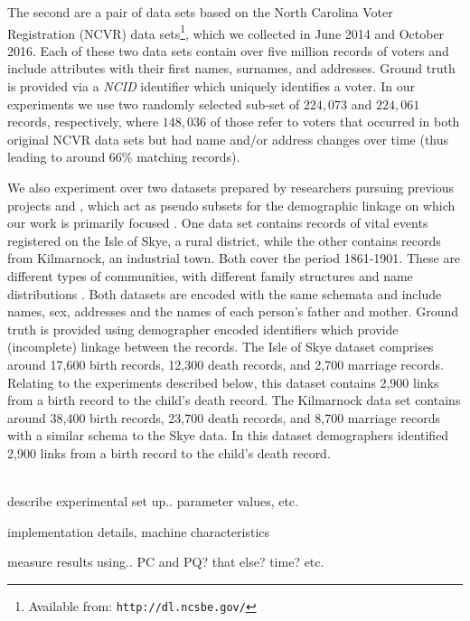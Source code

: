 \documentclass{llncs}
\begin{document}
The second are a pair of data sets based on the North Carolina Voter
Registration (NCVR) data sets\footnote{Available from: \texttt{http://dl.ncsbe.gov/}}, which we collected in June 2014 and
October 2016. Each of these two data sets contain over five million
records of voters and include attributes with their first names,
surnames, and addresses. Ground truth is provided via a \emph{NCID}
identifier which uniquely identifies a voter. In our experiments we
use two randomly selected sub-set of $224,073$ and $224,061$ records,
respectively, where $148,036$ of those refer to voters that occurred
in both original NCVR data sets but had name and/or address changes
over time (thus leading to around $66\%$ matching records).


We also experiment over two datasets prepared by researchers pursuing previous projects \cite{reid2002} and \cite{reid2006}, which act as pseudo subsets for the demographic linkage on which our work is primarily focused . One data set contains records of vital events registered on the Isle of Skye, a rural district, while the other contains records from Kilmarnock, an industrial town. Both cover the period 1861-1901. These are different types of communities, with different family structures and name distributions \cite{reid2002}. Both datasets are encoded with the same schemata and include names, sex, addresses and the names of each person's father and mother. Ground truth is provided using demographer encoded identifiers which provide (incomplete) linkage between the records.  The Isle of Skye dataset comprises around 17,600 birth records, 12,300 death records, and 2,700 marriage records. Relating to the experiments described below, this dataset contains 2,900 links from a birth record to the child's death record. The Kilmarnock data set contains around 38,400 birth records, 23,700 death records, and 8,700 marriage records with a similar schema to the Skye data. In this dataset demographers identified  2,900 links from a birth record to the child's death record.

~ \\
describe experimental set up.. parameter values, etc.

implementation details, machine characteristics

measure results using.. PC and PQ? that else? time? etc.

\end{document}
